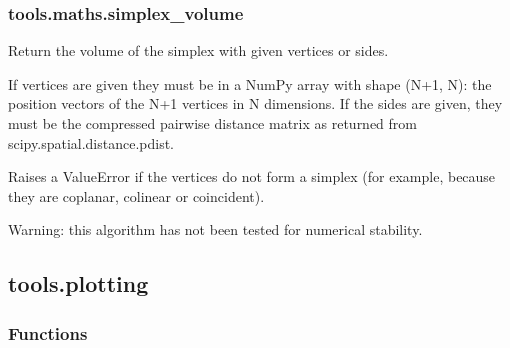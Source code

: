 \documentclass[letterpaper,10pt,english]{sphinxmanual}
\begin{document}
\subsubsection{tools.maths.simplex\_volume}
\label{\detokenize{_autosummary/tools.maths.simplex_volume:tools-maths-simplex-volume}}\label{\detokenize{_autosummary/tools.maths.simplex_volume::doc}}

\begin{fulllineitems}
\label{\detokenize{_autosummary/tools.maths.simplex_volume:tools.maths.simplex_volume}}
\sphinxAtStartPar
Return the volume of the simplex with given vertices or sides.

\sphinxAtStartPar
If vertices are given they must be in a NumPy array with shape (N+1, N):
the position vectors of the N+1 vertices in N dimensions. If the sides
are given, they must be the compressed pairwise distance matrix as
returned from scipy.spatial.distance.pdist.

\sphinxAtStartPar
Raises a ValueError if the vertices do not form a simplex (for example,
because they are coplanar, colinear or coincident).

\sphinxAtStartPar
Warning: this algorithm has not been tested for numerical stability.

\end{fulllineitems}



\subsection{tools.plotting}
\label{\detokenize{_autosummary/tools.plotting:module-tools.plotting}}\label{\detokenize{_autosummary/tools.plotting:tools-plotting}}\label{\detokenize{_autosummary/tools.plotting::doc}}\subsubsection*{Functions}
\end{document}
